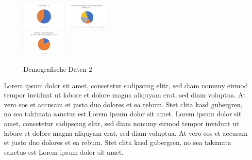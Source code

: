 \documentclass[conference]{IEEEtran}
\begin{document}
\begin{figure}[ht]
	\centering
	\includegraphics[width=0.2\textwidth]{assets/gesch.png} \hspace{-5pt}
	\includegraphics[width=0.2\textwidth]{assets/headset.png} \\
	\vspace{2pt}
	\includegraphics[width=0.2\textwidth]{assets/optBeein.png} 
	\caption{Demografische Daten 2}
	\label{fig:Demografische Daten 2}
\end{figure}
Lorem ipsum dolor sit amet, consetetur sadipscing elitr, sed diam nonumy eirmod tempor invidunt ut labore et dolore magna aliquyam erat, sed diam voluptua. At vero eos et accusam et justo duo dolores et ea rebum. Stet clita kasd gubergren, no sea takimata sanctus est Lorem ipsum dolor sit amet. Lorem ipsum dolor sit amet, consetetur sadipscing elitr, sed diam nonumy eirmod tempor invidunt ut labore et dolore magna aliquyam erat, sed diam voluptua. At vero eos et accusam et justo duo dolores et ea rebum. Stet clita kasd gubergren, no sea takimata sanctus est Lorem ipsum dolor sit amet.
\end{document}

